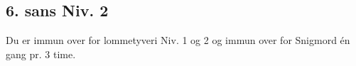 \subsection*{6. sans Niv. 2}
Du er immun over for lommetyveri Niv. 1 og 2 og immun over for Snigmord én gang pr. 3 time.\\